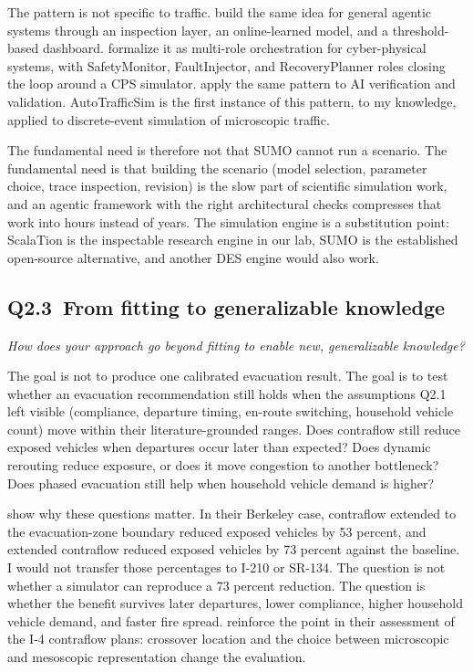 \begin{bibunit}[plainnat]
The pattern is not specific to traffic.
\citet{koohestani2025agentguard} build the same idea for general agentic
systems through an inspection layer, an online-learned model, and a
threshold-based dashboard. \citet{srinivasan2025dura} formalize it as
multi-role orchestration for cyber-physical systems, with SafetyMonitor,
FaultInjector, and RecoveryPlanner roles closing the loop around a CPS
simulator. \citet{kwon2026aivv} apply the same pattern to AI
verification and validation. AutoTrafficSim is the first instance of
this pattern, to my knowledge, applied to discrete-event simulation of
microscopic traffic.

The fundamental need is therefore not that SUMO cannot run a scenario.
The fundamental need is that building the scenario (model selection,
parameter choice, trace inspection, revision) is the slow part of
scientific simulation work, and an agentic framework with the right
architectural checks compresses that work into hours instead of years.
The simulation engine is a substitution point: ScalaTion is the
inspectable research engine in our lab, SUMO is the established
open-source alternative, and another DES engine would also work.

\subsection{Q2.3\ From fitting to generalizable knowledge}

\textit{How does your approach go beyond fitting to enable new, generalizable knowledge?}

The goal is not to produce one calibrated evacuation result. The goal is
to test whether an evacuation recommendation still holds when the
assumptions Q2.1 left visible (compliance, departure timing, en-route
switching, household vehicle count) move within their literature-grounded
ranges. Does contraflow still reduce exposed vehicles when departures
occur later than expected? Does dynamic rerouting reduce exposure, or
does it move congestion to another bottleneck? Does phased evacuation
still help when household vehicle demand is higher?

\citet{zhao2021berkeleywildfire} show why these questions matter. In
their Berkeley case, contraflow extended to the evacuation-zone boundary
reduced exposed vehicles by 53 percent, and extended contraflow reduced
exposed vehicles by 73 percent against the baseline. I would not
transfer those percentages to I-210 or SR-134. The question is not
whether a simulator can reproduce a 73 percent reduction. The question
is whether the benefit survives later departures, lower compliance,
higher household vehicle demand, and faster fire spread.
\citet{dixit2008contraflow} reinforce the point in their assessment of
the I-4 contraflow plans: crossover location and the choice between
microscopic and mesoscopic representation change the evaluation.


\end{bibunit}
